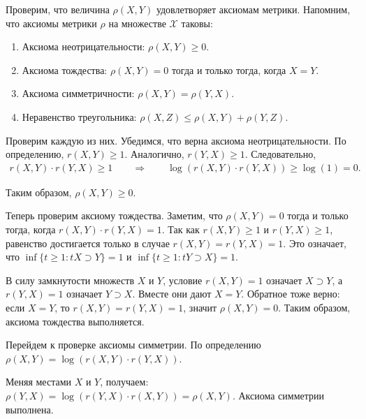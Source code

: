 \documentclass[../main.tex]{subfiles}
\begin{document}
Проверим, что величина $ \rho (X, Y)$ удовлетворяет аксиомам метрики. 
Напомним, что аксиомы метрики $\rho$ на множестве $\mathcal{X}$ таковы:
\begin{enumerate}
	\item Аксиома неотрицательности: $\rho(X,Y) \geqslant 0$.
	\item Аксиома тождества: $\rho(X,Y) = 0 $ тогда и только тогда, когда $X = Y$.
	\item Аксиома симметричности: $ \rho(X,Y) = \rho(Y,X) $.
	\item Неравенство треугольника: $ \rho(X,Z) \leqslant \rho(X,Y) + \rho(Y,Z) $.
\end{enumerate}

Проверим каждую из них. 
Убедимся, что верна аксиома неотрицательности. 
По определению, $r(X,Y) \geqslant 1$. 
Аналогично, $ r(Y,X) \geqslant 1 $. 
Следовательно, 
\begin{gather*}
	r(X,Y)\cdot r(Y,X) \geqslant 1 \qquad \Rightarrow \qquad
	 \log(r(X,Y) \cdot r(Y,X)) \geqslant \log(1) = 0.
\end{gather*}

Таким образом, $ \rho(X,Y) \geqslant 0 $.


Теперь проверим аксиому тождества.
Заметим, что $\rho(X,Y) = 0 $ тогда и только тогда, когда $ r(X,Y) \cdot r(Y,X) = 1$.
Так как $r(X,Y) \geqslant 1 $ и $r(Y,X) \geqslant 1 $, равенство достигается только в случае $r(X,Y) = r(Y,X) = 1 $.
Это означает, что $\inf\{t \geqslant 1 : tX \supset Y \} = 1$ и $\inf\{t \geqslant 1 : tY \supset X \} = 1$.

В силу замкнутости множеств $X$ и $Y$, условие $ r(X,Y)=1$ означает $X \supset Y$, а $r(Y,X)=1$ означает $Y \supset X$. 
Вместе они дают $X=Y$.
Обратное тоже верно: если $X=Y$, то $r(X,Y)=r(Y,X)=1$, значит $\rho(X,Y)=0$.
Таким образом, аксиома тождества выполняется.

Перейдем к проверке аксиомы симметрии. 
По определению 	$\rho(X,Y)= \log(r(X,Y) \cdot r(Y,X))$.

Меняя местами $X$ и $Y$, получаем:
$\rho(Y, X) = \log(r(Y,X) \cdot r(X,Y))=\rho(X,Y).$
Аксиома симметрии выполнена.
\end{document}

